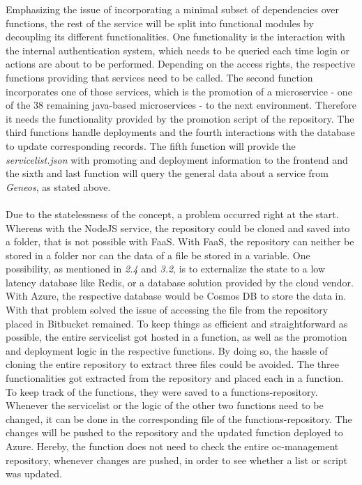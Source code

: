 \documentclass[a4paper,twoside,11pt, pagesize]{scrartcl}
\begin{document}
\begin{spacing}{1.2}
Emphasizing the issue of incorporating a minimal subset of dependencies over functions, the rest of the service will be split into functional modules by decoupling its different functionalities. One functionality is the interaction with the internal authentication system, which needs to be queried each time login or actions are about to be performed. Depending on the access rights, the respective functions providing that services need to be called. The second function incorporates one of those services, which is the promotion of a microservice - one of the 38 remaining java-based microservices - to the next environment. Therefore it needs the functionality provided by the promotion script of the repository. The third functions handle deployments and the fourth interactions with the database to update corresponding records. The fifth function will provide the \textit{servicelist.json} with promoting and deployment information to the frontend and the sixth and last function will query the general data about a service from \textit{Geneos}, as stated above.\\\\Due to the statelessness of the concept, a problem occurred right at the start. Whereas with the NodeJS service, the repository could be cloned and saved into a folder, that is not possible with FaaS. With FaaS, the repository can neither be stored in a folder nor can the data of a file be stored in a variable. One possibility, as mentioned in \textit{2.4} and \textit{3.2}, is to externalize the state to a low latency database like Redis, or a database solution provided by the cloud vendor. With Azure, the respective database would be Cosmos DB to store the data in. With that problem solved the issue of accessing the file from the repository placed in Bitbucket remained. To keep things as efficient and straightforward as possible, the entire servicelist got hosted in a function, as well as the promotion and deployment logic in the respective functions. By doing so, the hassle of cloning the entire repository to extract three files could be avoided. The three functionalities got extracted from the repository and placed each in a function. To keep track of the functions, they were saved to a functions-repository. Whenever the servicelist or the logic of the other two functions need to be changed, it can be done in the corresponding file of the functions-repository. The changes will be pushed to the repository and the updated function deployed to Azure. Hereby, the function does not need to check the entire oc-management repository, whenever changes are pushed, in order to see whether a list or script was updated. 

\end{spacing}
\end{document}
